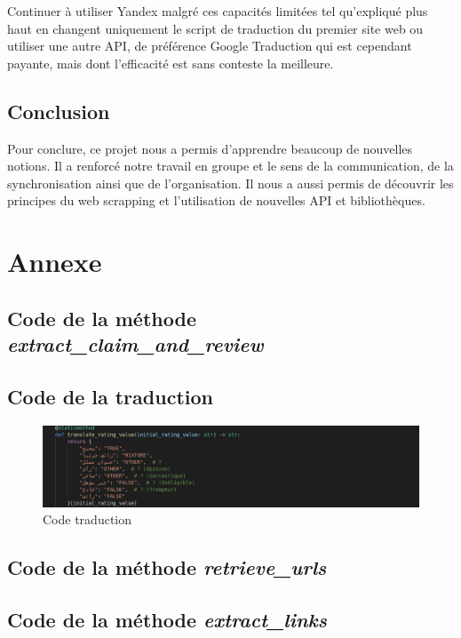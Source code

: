 \documentclass[oneside,13pt,a4paper]{report}
\begin{document}
Continuer à utiliser Yandex malgré ces capacités limitées tel qu'expliqué plus haut en changent uniquement le script de traduction du premier site web ou utiliser une autre API, de préférence Google Traduction qui est cependant payante, mais dont l'efficacité est sans conteste la meilleure.
\section{Conclusion}
Pour conclure, ce projet nous a permis d'apprendre beaucoup de nouvelles notions. Il a renforcé notre travail en groupe et le sens de la communication, de la synchronisation ainsi que de l'organisation. Il nous a aussi permis de découvrir les principes du web scrapping et l'utilisation de nouvelles API et bibliothèques.

\appendix
\chapter{Annexe}
\section{Code de la méthode \textit{extract\_claim\_and\_review}}

\section{Code de la traduction}
\begin{figure}[h]
	\centering
	\begin{minipage}[c]{1.0\linewidth}
		\includegraphics[width=1\textwidth]{img/codear.png}
		\caption{Code traduction}
	\end{minipage}
\end{figure}

\section{Code de la méthode \textit{retrieve\_urls} }

\section{Code de la méthode \textit{extract\_links} }

\end{document}
